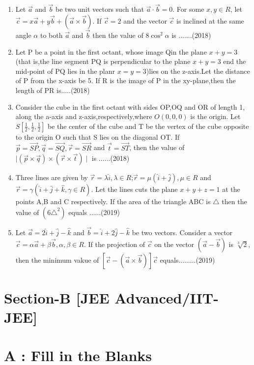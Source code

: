 \documentclass[12pt]{article}
\providecommand{\brak}[1]{\ensuremath{\left(#1\right)}}
\providecommand{\sbrak}[1]{\ensuremath{{}\left[#1\right]}}
\begin{document}
\begin{enumerate}
\item Let $\vec{a}$ and $\vec{b}$ be two unit vectors such that $\vec{a}\cdot\vec{b}=0$. For some $x,y\in R$, let $\vec{c}=x\vec{a}+y\vec{b}+\brak{\vec{a}\times\vec{b}}$. If $\vec{c}=2$ and the vector $\vec{c}$ is inclined at the same angle $\alpha$ to both $\vec{a}$ and $\vec{b}$ then the value of $8\cos^2\alpha$ is .......(2018)
\item Let P be a point in  the first octant, whose image Qin the plane $x+y=3$(that is,the line segment PQ is perpendicular to the plane $x+y=3$ end the mid-point of PQ lies in the planr $x=y=3$)lies on the z-axis.Let the distance of P from the x-axis be 5. If R is the image of P in the xy-plane,then the length of PR is.....(2018)
\item Consider the cube in the first octant with sides OP,OQ and OR of length 1, along the a-axis and z-axis,respectively,where $O(0,0,0)$ is the origin. Let $S\sbrak{\frac{1}{2},\frac{1}{2},\frac{1}{2}}$ be the center of the cube and T be the vertex of the cube opposite to the origin O such that S lies on the diagonal OT. If $\vec{p}=\overrightarrow{SP},\vec{q}=\overrightarrow{SQ},\vec{r}=\overrightarrow{SR}$ and $\vec{t}=\overrightarrow{ST}$, then the value of $\mid \brak{\vec{p}\times\vec{q}}\times\brak{\vec{r}\times\vec{t}}\mid$ is ......(2018)
\item Three lines are given by $\vec{r}=\lambda \hat{i},\lambda \in R$;$\vec{r}=\mu \brak{\hat{i}+\hat{j}},\mu \in R$ and $\vec{r}=\gamma\brak{\hat{i}+\hat{j}+\hat{k},\gamma\in R}$. Let the lines cuts the plane $x+y+z=1$ at the points A,B and C respectively. If the area of the triangle ABC is $\triangle$ then the value of $\brak{6\triangle^2}$ equals ......(2019)
\item Let $\vec{a}=2\hat{i}+\hat{j}-\hat{k}$ and $\vec{b}=\hat{i}+2\hat{j}-\hat{k}$ be two vectors. Consider a vector $\vec{c}=\alpha\vec{a}+\beta\vec{b},\alpha,\beta \in R$. If the projection of $\vec{c}$ on the vector $\brak{\vec{a}-\vec{b}}$ is $\sqrt[3]{2}$, then the minimum vakue of $\sbrak{\vec{c}-\brak{\vec{a}\times\vec{b}}}\vec{c}$ equals.........(2019)

\end{enumerate} 
\section*{Section-B    [JEE Advanced/IIT-JEE]}
\section*{A    :  Fill in the Blanks}
\end{document}
